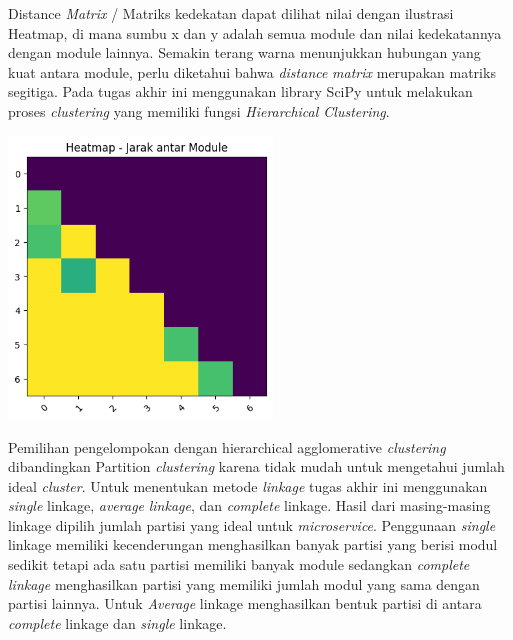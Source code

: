 Distance \textit{Matrix} / Matriks kedekatan dapat dilihat nilai dengan ilustrasi Heatmap, di mana sumbu x dan y adalah semua module dan nilai kedekatannya dengan module lainnya. Semakin terang warna menunjukkan hubungan yang kuat antara module, perlu diketahui bahwa \textit{distance} \textit{matrix} merupakan matriks segitiga. Pada tugas akhir ini menggunakan library SciPy untuk melakukan proses \textit{clustering} yang memiliki fungsi \textit{Hierarchical Clustering}.

\begin{center}
	\includegraphics[width=7cm]{img/bab_3/heatmap.png}
	\label{fig:asd}
\end{center}

Pemilihan pengelompokan dengan hierarchical agglomerative \textit{clustering} dibandingkan Partition \textit{clustering} karena tidak mudah untuk mengetahui jumlah ideal \textit{cluster}. Untuk menentukan metode \textit{linkage} tugas akhir ini menggunakan \textit{single} linkage, \textit{average} \textit{linkage}, dan \textit{complete} linkage. Hasil dari masing-masing linkage dipilih jumlah partisi yang ideal untuk \textit{microservice}. Penggunaan \textit{single} linkage memiliki kecenderungan menghasilkan banyak partisi yang berisi modul sedikit tetapi ada satu partisi memiliki banyak module sedangkan \textit{complete} \textit{linkage} menghasilkan partisi yang memiliki jumlah modul yang sama dengan partisi lainnya. Untuk \textit{Average} linkage menghasilkan bentuk partisi di antara \textit{complete} linkage dan \textit{single} linkage.

